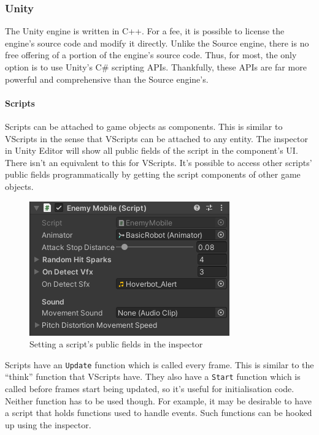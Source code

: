 \documentclass[a4paper, 12pt]{scrartcl}
\begin{document}
\subsubsection{Unity}
The Unity engine is written in C++. For a fee, it is possible to license the engine's source code and modify it directly. Unlike the Source engine, there is no free offering of a portion of the engine's source code. Thus, for most, the only option is to use Unity's C\# scripting APIs. Thankfully, these APIs are far more powerful and comprehensive than the Source engine's.

\paragraph{Scripts}
Scripts can be attached to game objects as components. This is similar to VScripts in the sense that VScripts can be attached to any entity. The inspector in Unity Editor will show all public fields of the script in the component's UI. There isn't an equivalent to this for VScripts. It's possible to access other scripts' public fields programmatically by getting the script components of other game objects.

\begin{figure}[!ht]
  \centering
  \includegraphics[scale=0.75]{images/unity_script_inspector.png}
  \caption{Setting a script's public fields in the inspector}
  \label{fig:unity_script_inspector}
\end{figure}

Scripts have an \texttt{Update} function which is called every frame. This is similar to the ``think'' function that VScripts have. They also have a \texttt{Start} function which is called before frames start being updated, so it's useful for initialisation code. Neither function has to be used though. For example, it may be desirable to have a script that holds functions used to handle events. Such functions can be hooked up using the inspector.
\end{document}
